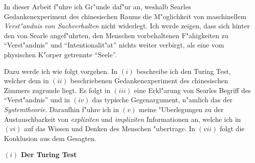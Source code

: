 \documentclass[a4paper, emulatestandardclasses, 12pt]{scrartcl}
\begin{document}
\begin{onehalfspace} 

%


\noindent In dieser Arbeit f"uhre ich Gr"unde daf"ur an, weshalb Searles Gedankenexperiment des chinesischen Raums die M"oglichkeit von maschinellem \emph{Verst"andnis von Sachverhalten} nicht widerlegt. Ich werde zeigen, dass sich hinter den von Searle angef"uhrten, den Menschen vorbehaltenen F"ahigkeiten zu "`Verst"andnis"' und "`Intentionalit"at"' nichts weiter verbirgt, als eine vom physischen K"orper getrennte "`Seele"'.

Dazu werde ich wie folgt vorgehen. In $(i)$ beschreibe ich den Turing Test, welcher dem in $(ii)$ beschriebenen Gedankenexperiment des chinesischen Zimmers zugrunde liegt. Es folgt in  $(iii)$ eine Erkl"arung von Searles Begriff des "`Verst"andnis"' und in $(iv)$ das typische Gegenargument, n"amlich das der \emph{Systemtheorie}. Daraufhin f"uhre ich in $(v)$ meine "Uberlegungen zu der Austauschbarkeit von \emph{expliziten} und \emph{impliziten} Informationen an, welche ich in $(vi)$ auf das Wissen und Denken des Menschen "ubertrage. In $(vii)$ folgt die Konklusion aus dem Gesagten.
\vspace{5mm}


\noindent\textbf{$(i)$ Der Turing Test}


\end{onehalfspace}
\end{document}
